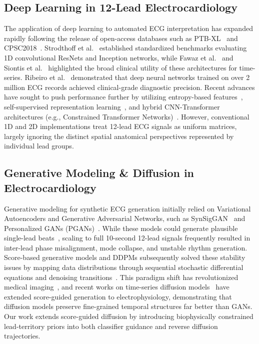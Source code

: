 \documentclass[5p,twocolumn,10pt]{elsarticle}
\begin{document}
\subsection{Deep Learning in 12-Lead Electrocardiology}
The application of deep learning to automated ECG interpretation has expanded rapidly following the release of open-access databases such as PTB-XL~\cite{wagner2020ptb} and CPSC2018~\cite{liu2018open}. Strodthoff et al.~\cite{strodthoff2020deep} established standardized benchmarks evaluating 1D convolutional ResNets and Inception networks, while Fawaz et al.~\cite{fawaz2019deep} and Siontis et al.~\cite{siontis2021artificial} highlighted the broad clinical utility of these architectures for time-series. Ribeiro et al.~\cite{ribeiro2020automatic} demonstrated that deep neural networks trained on over 2 million ECG records achieved clinical-grade diagnostic precision. Recent advances have sought to push performance further by utilizing entropy-based features~\cite{smigiel2021ecg}, self-supervised representation learning~\cite{mehari2022self}, and hybrid CNN-Transformer architectures (e.g., Constrained Transformer Networks)~\cite{che2021constrained}. However, conventional 1D and 2D implementations treat 12-lead ECG signals as uniform matrices, largely ignoring the distinct spatial anatomical perspectives represented by individual lead groups.

\subsection{Generative Modeling \& Diffusion in Electrocardiology}
Generative modeling for synthetic ECG generation initially relied on Variational Autoencoders and Generative Adversarial Networks, such as SynSigGAN~\cite{hazra2020synsiggan} and Personalized GANs (PGANs)~\cite{golany2020pgans}. While these models could generate plausible single-lead beats~\cite{dempsey2022generative}, scaling to full 10-second 12-lead signals frequently resulted in inter-lead phase misalignment, mode collapse, and unstable rhythm generation. Score-based generative models and DDPMs subsequently solved these stability issues by mapping data distributions through sequential stochastic differential equations and denoising transitions~\cite{ho2020denoising, song2020denoising}. This paradigm shift has revolutionized medical imaging~\cite{kazerouni2023diffusion}, and recent works on time-series diffusion models~\cite{neifar2024diffecg} have extended score-guided generation to electrophysiology, demonstrating that diffusion models preserve fine-grained temporal structures far better than GANs. Our work extends score-guided diffusion by introducing biophysically constrained lead-territory priors into both classifier guidance and reverse diffusion trajectories.
\end{document}
